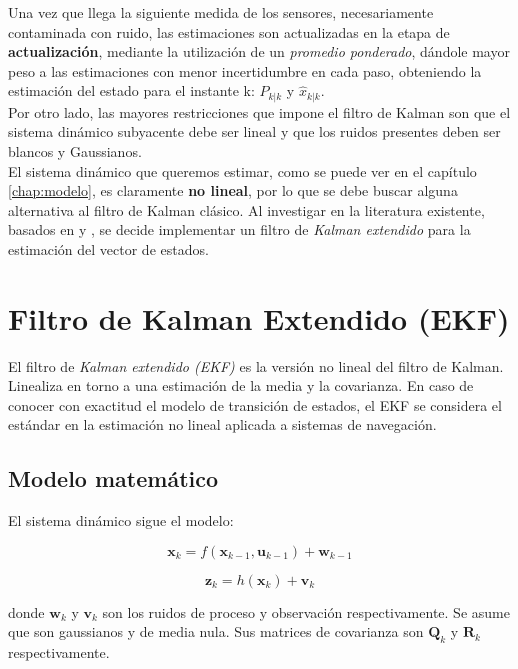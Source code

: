 \documentclass[main]{subfiles}
\begin{document}
Una vez que llega la siguiente medida de los sensores, necesariamente contaminada con ruido, las estimaciones son actualizadas en la etapa de \textbf{actualización}, mediante la utilización de un \emph{promedio ponderado}, dándole mayor peso a las estimaciones con menor incertidumbre en cada paso, obteniendo la estimación del estado para el instante k: $P_{k|k}$ y $\hat{x}_{k|k}$.\\

Por otro lado, las mayores restricciones que impone el filtro de Kalman son que el sistema dinámico subyacente debe ser lineal y que los ruidos presentes deben ser blancos y Gaussianos.\\

El sistema dinámico que queremos estimar, como se puede ver en el capítulo \ref{chap:modelo}, es claramente \textbf{no lineal}, por lo que se debe buscar alguna alternativa al filtro de Kalman clásico. Al investigar en la literatura existente, basados en \cite{bib:kalman} y \cite{bib:kalman2}, se decide implementar un filtro de \emph{Kalman extendido} para la estimación del vector de estados.

\section{Filtro de Kalman Extendido (EKF)}

El filtro de \emph{Kalman extendido (EKF)} es la versión no lineal del filtro de Kalman. Linealiza en torno a una estimación de la media y la covarianza. En caso de conocer con exactitud el modelo de transición de estados, el EKF se considera el estándar en la estimación no lineal aplicada a sistemas de navegación.\\

\subsection{Modelo matemático}

El sistema dinámico sigue el modelo:

$$\mathbf{x}_{k} = f(\mathbf{x}_{k-1}, \mathbf{u}_{k-1}) + \mathbf{w}_{k-1}$$

$$\mathbf{z}_{k} = h(\mathbf{x}_{k}) + \mathbf{v}_{k}$$

donde $\mathbf{w}_k$ y $\mathbf{v}_k$ son los ruidos de proceso y observación respectivamente. Se asume que son gaussianos y de media nula. Sus matrices de covarianza son $\mathbf{Q}_k$ y $\mathbf{R}_k$ respectivamente.
\end{document}

